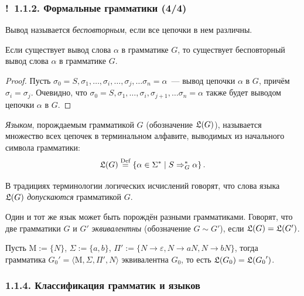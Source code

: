 \documentclass[mathserif,12pt,aspectratio=169]{beamer}
\renewcommand{\index}[1]{}
\def\odmkey#1#2{{\it\color{red} #1}\index{#2}}
\def\Set#1#2{\left\{ #1 \mid #2 \right\}}
\def\Assign{\operatorname{:=}}
\def\Def{\stackrel{\text{Def}}{=}}
\def\Ok{{\color{green}\textbf{!}\ }}
\begin{document}
\begin{frame}
\frametitle{\Ok 1.1.2. Формальные грамматики (4/4)}
Вывод называется \odmkey{бесповторным}{Вывод!бесповторный}, если
все цепочки в нем различны.

\begin{lemma}
Если существует вывод слова $\alpha$ в грамматике $G$, то существует бесповторный
вывод слова $\alpha$ в грамматике $G$.
\end{lemma}
\begin{proof}
Пусть
$\sigma_0=S,\sigma_1,\dots,\sigma_i,\dots,\sigma_j,\dots\sigma_n=\alpha$~---
вывод цепочки $\alpha$ в $G$, причём $\sigma_i = \sigma_j$. Очевидно, что
$\sigma_0=S,\sigma_1,\dots,\sigma_i,\sigma_{j+1},\dots\sigma_n=\alpha$
также будет выводом цепочки $\alpha$ в $G$.
\end{proof}

\smallskip
\odmkey{Языком}{Язык!порождаемый грамматикой}, порождаемым
грамматикой $G$ (обозначение $\frak{L}(G)$), называется множество всех
цепочек в терминальном алфавите, выводимых из начального символа грамматики:
$$
\frak{L}(G)\Def \Set{\alpha\in \Sigma^*}{S\Rightarrow_G^*\alpha}.
$$
\begin{remark}
В традициях терминологии логических исчислений говорят, что слова языка $\frak{L}(G)$ \odmkey{допускаются}{Слово!допустимое} грамматикой $G$.
\end{remark}

Один и тот же язык может быть порождён
разными грамматиками.
Говорят, что две грамматики $G$ и $G'$
\odmkey{эквивалентны}{Эквивалентность!грамматик} (обозначение
$G\sim G'$), если $\frak{L}(G)=\frak{L}(G')$.

\begin{example}
Пусть $\mathrm{M}\Assign \{N\}$,
$\Sigma\Assign\{a,b\}$,
${\Pi}'\Assign\{N\to \varepsilon, N\to aN,
N\to bN\}$, тогда грамматика  
${G_0}'=\langle \mathrm{M}, \Sigma, {\Pi}', N\rangle$ эквивалентна $G_0$,
то есть $\frak{L}(G_0)= \frak{L}({G_0}')$.
\end{example}
\end{frame}


\subsubsection{1.1.4. Классификация грамматик и языков}
\label{1.1.4.}
\end{document}
